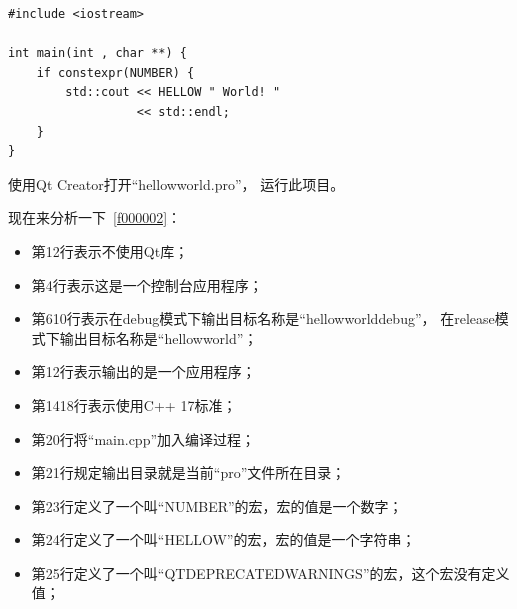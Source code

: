 \begin{lstlisting}[label=f000003,
caption=GoodLuck,
title=\lstlistingname\ \thelstlisting
]
#include <iostream>

int main(int , char **) {
    if constexpr(NUMBER) {
        std::cout << HELLOW " World! "
                  << std::endl;
    }
}
\end{lstlisting}          %


使用Qt Creator打开“hellow\underline{\hspace{0.5em}}world.pro”，
运行此项目。

现在来分析一下\lstlistingname\ \ref{f000002}：
\begin{itemize}
\item 第1\raisebox{0.16ex}{\sourcefonttwo\~{}}2行表示不使用Qt库；
\item 第4行表示这是一个控制台应用程序；
\item 第6\raisebox{0.16ex}{\sourcefonttwo\~{}}10行表示在debug模式下输出目标名称是“hellow\underline{\hspace{0.5em}}world\underline{\hspace{0.5em}}debug”，
在release模式下输出目标名称是“hellow\underline{\hspace{0.5em}}world”；
\item 第12行表示输出的是一个应用程序；
\item 第14\raisebox{0.16ex}{\sourcefonttwo\~{}}18行表示使用C{\sourcefonttwo{}+}{\sourcefonttwo{}+} 17标准；
\item 第20行将“main.cpp”加入编译过程；
\item 第21行规定输出目录就是当前“pro”文件所在目录；
\item 第23行定义了一个叫“NUMBER”的宏，宏的值是一个数字；
\item 第24行定义了一个叫“HELLOW”的宏，宏的值是一个字符串；
\item 第25行定义了一个叫“QT\underline{\hspace{0.5em}}DEPRECATED\underline{\hspace{0.5em}}WARNINGS”的宏，这个宏没有定义值；
\end{itemize}

